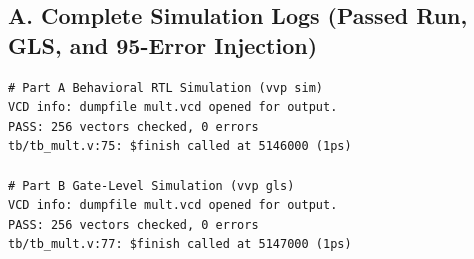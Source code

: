 \documentclass[conference,10pt]{IEEEtran}
\begin{document}
\subsection*{A. Complete Simulation Logs (Passed Run, GLS, and 95-Error Injection)}
\label{app:logs}

\begin{lstlisting}[title={\textbf{1. Part A Behavioral RTL Pass Log \& Part B GLS Pass Log}}]
# Part A Behavioral RTL Simulation (vvp sim)
VCD info: dumpfile mult.vcd opened for output.
PASS: 256 vectors checked, 0 errors
tb/tb_mult.v:75: $finish called at 5146000 (1ps)

# Part B Gate-Level Simulation (vvp gls)
VCD info: dumpfile mult.vcd opened for output.
PASS: 256 vectors checked, 0 errors
tb/tb_mult.v:77: $finish called at 5147000 (1ps)
\end{lstlisting}
\end{document}
